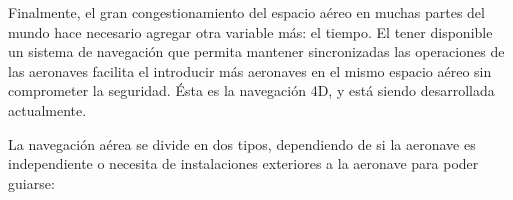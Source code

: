 Finalmente, el gran congestionamiento del espacio a\'ereo en muchas partes del mundo hace necesario agregar otra variable m\'as: el tiempo. El tener disponible un sistema de navegaci\'on que permita mantener sincronizadas las operaciones de las aeronaves facilita el introducir m\'as aeronaves en el mismo espacio a\'ereo sin comprometer la seguridad. \'Esta es la navegaci\'on 4D, y est\'a siendo desarrollada actualmente. 

La navegaci\'on a\'erea se divide en dos tipos, dependiendo de si la aeronave es independiente o necesita de instalaciones exteriores a la aeronave para poder guiarse:





